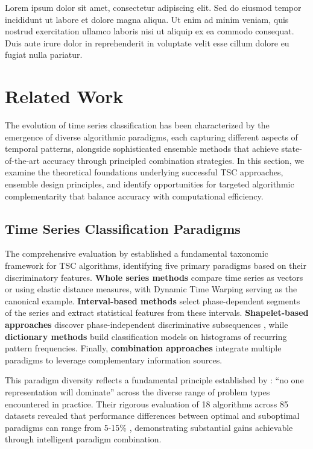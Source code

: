 \documentclass[pdflatex,sn-basic]{sn-jnl}           %
\theoremstyle{thmstyleone}%
\theoremstyle{thmstyletwo}%
\theoremstyle{thmstylethree}%
\begin{document}
Lorem ipsum dolor sit amet, consectetur adipiscing elit. Sed do eiusmod tempor incididunt ut labore et dolore magna aliqua. Ut enim ad minim veniam, quis nostrud exercitation ullamco laboris nisi ut aliquip ex ea commodo consequat. Duis aute irure dolor in reprehenderit in voluptate velit esse cillum dolore eu fugiat nulla pariatur.

\section{Related Work}\label{sec2}

The evolution of time series classification has been characterized by the emergence of diverse algorithmic paradigms, each capturing different aspects of temporal patterns, alongside sophisticated ensemble methods that achieve state-of-the-art accuracy through principled combination strategies. In this section, we examine the theoretical foundations underlying successful TSC approaches, ensemble design principles, and identify opportunities for targeted algorithmic complementarity that balance accuracy with computational efficiency.

\subsection{Time Series Classification Paradigms}

The comprehensive evaluation by \citet[p.~610]{tsc-bakeoff} established a fundamental taxonomic framework for TSC algorithms, identifying five primary paradigms based on their discriminatory features. \textbf{Whole series methods} compare time series as vectors or using elastic distance measures, with Dynamic Time Warping serving as the canonical example. \textbf{Interval-based methods} select phase-dependent segments of the series and extract statistical features from these intervals. \textbf{Shapelet-based approaches} discover phase-independent discriminative subsequences \cite{time_series_shapelets}, while \textbf{dictionary methods} build classification models on histograms of recurring pattern frequencies. Finally, \textbf{combination approaches} integrate multiple paradigms to leverage complementary information sources.

This paradigm diversity reflects a fundamental principle established by \citet[p.~637]{tsc-bakeoff}: ``no one representation will dominate'' across the diverse range of problem types encountered in practice. Their rigorous evaluation of 18 algorithms across 85 datasets revealed that performance differences between optimal and suboptimal paradigms can range from 5-15\% \citep[p.~647, Table~11]{tsc-bakeoff}, demonstrating substantial gains achievable through intelligent paradigm combination.
\end{document}
